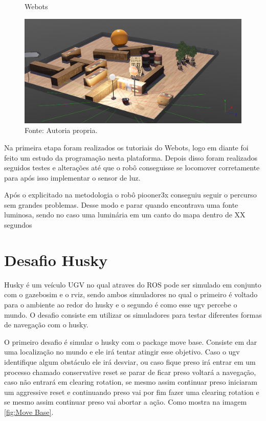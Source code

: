 \begin{figure}[h!]
    \centering
    \caption{Webots}
    \includegraphics[width=1\textwidth]{Figures/webots3.png}
    \caption*{Fonte: Autoria propria.}
    \label{fig:Webots}
\end{figure}


Na primeira etapa foram realizados os tutoriais do Webots, logo em diante foi feito um estudo da programação nesta plataforma. Depois disso foram realizados seguidos testes e alterações até que o robô conseguisse se locomover corretamente para após isso implementar o sensor de luz.


Após o explicitado na metodologia o robô piooner3x conseguiu seguir o percurso sem grandes problemas. Desse modo e parar quando encontrava uma fonte luminosa, sendo no caso uma luminária em um canto do mapa dentro de XX segundos

\section{Desafio Husky}

Husky é um veículo UGV no qual atraves do ROS pode ser 
simulado em conjunto com o gazebosim e o rviz, sendo ambos
simuladores no qual o primeiro é voltado para o ambiente 
ao redor do husky e o segundo é como esse ugv percebe o mundo.
O desafio consiste em utilizar os simuladores para testar
diferentes formas de navegação com o husky.

O primeiro desafio é simular o husky com o package move base. 
Consiste em dar uma localização no mundo e ele irá tentar atingir 
esse objetivo. Caso o ugv identifique algum obstáculo ele irá desviar,
ou caso fique preso irá entrar em um processo chamado conservative reset
se parar de ficar preso voltará a navegação, caso não entrará em 
clearing rotation, se mesmo assim continuar preso iniciaram um aggressive reset
e continuando preso vai por fim fazer uma clearing rotation e se mesmo 
assim continuar preso vai abortar a ação. Como mostra na imagem \ref{fig:Move Base}.

